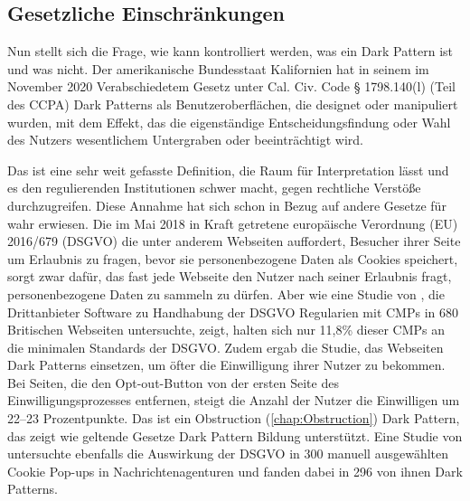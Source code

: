\documentclass[conference,compsoc,final,a4paper]{IEEEtran}
\begin{document}


\subsection{Gesetzliche Einschränkungen}


Nun stellt sich die Frage, wie kann kontrolliert werden, was ein Dark Pattern ist und was nicht. Der amerikanische Bundesstaat Kalifornien hat in seinem im November 2020 Verabschiedetem Gesetz unter Cal. Civ. Code § 1798.140(l) (Teil des \ac{CCPA}) Dark Patterns als Benutzeroberflächen, die designet oder manipuliert wurden, mit dem Effekt, das die eigenständige Entscheidungsfindung oder Wahl des Nutzers wesentlichem Untergraben oder beeinträchtigt wird.

Das ist eine sehr weit gefasste Definition, die Raum für Interpretation lässt und es den regulierenden Institutionen schwer macht, gegen rechtliche Verstöße durchzugreifen. Diese Annahme hat sich schon in Bezug auf andere Gesetze für wahr erwiesen.
Die im Mai 2018 in Kraft getretene europäische Verordnung (EU) 2016/679 (\ac{DSGVO}) die unter anderem Webseiten auffordert, Besucher ihrer Seite um Erlaubnis zu fragen, bevor sie personenbezogene Daten als Cookies speichert, sorgt zwar dafür, das fast jede Webseite den Nutzer nach seiner Erlaubnis fragt, personenbezogene Daten zu sammeln zu dürfen. Aber wie eine Studie von \citeauthor{Nouwens2020} \autocite{Nouwens2020}, die Drittanbieter Software zu Handhabung der \acs{DSGVO} Regularien mit \acp{CMP} in 680 Britischen Webseiten untersuchte, zeigt, halten sich nur 11,8\% dieser \acsp{CMP} an die minimalen Standards der \acs{DSGVO}.
Zudem ergab die Studie, das Webseiten Dark Patterns einsetzen, um öfter die Einwilligung ihrer Nutzer zu bekommen. Bei Seiten, die den Opt-out-Button von der ersten Seite des Einwilligungsprozesses entfernen, steigt die Anzahl der Nutzer die Einwilligen um 22–23 Prozentpunkte. Das ist ein Obstruction (\autoref{chap:Obstruction}) Dark Pattern, das zeigt wie geltende Gesetze Dark Pattern Bildung unterstützt. Eine Studie von \citeauthor{Soe2020} untersuchte ebenfalls die Auswirkung der  \acs{DSGVO} in 300 manuell ausgewählten Cookie Pop-ups in Nachrichtenagenturen und fanden dabei in 296 von ihnen Dark Patterns.
\end{document}
